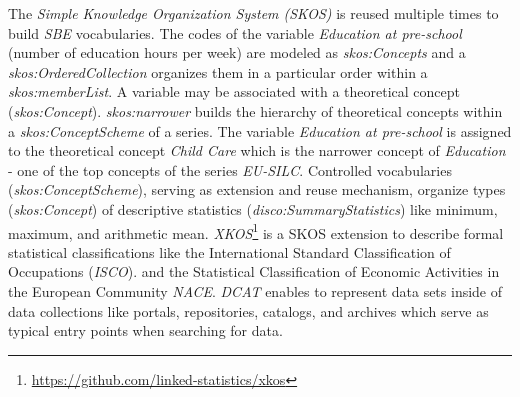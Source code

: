\documentclass{llncs}
\begin{document}
The \emph{Simple Knowledge Organization System (SKOS)} is reused multiple times to build \emph{SBE} vocabularies.
The codes of the variable \emph{Education at pre-school} (number of education hours per week) are modeled as \emph{skos:Concepts} and 
a \emph{skos:OrderedCollection} organizes them in a particular order within a \emph{skos:memberList}.
A variable may be associated with a theoretical concept (\emph{skos:Concept}). 
\emph{skos:narrower} builds the hierarchy of theoretical concepts within a \emph{skos:ConceptScheme} of a series.
The variable \emph{Education at pre-school} is assigned to the theoretical concept \emph{Child Care} which is the narrower concept of \emph{Education} - one of the top concepts of the series \emph{EU-SILC}.
Controlled vocabularies (\emph{skos:ConceptScheme}), serving as extension and reuse mechanism,
organize types (\emph{skos:Concept}) of descriptive statistics (\emph{disco:SummaryStatistics}) like minimum, maximum, and arithmetic mean.
\emph{XKOS}\footnote{\url{https://github.com/linked-statistics/xkos}} is a SKOS extension to describe formal statistical classifications like the International Standard Classification of Occupations (\emph{ISCO}). 
and the Statistical Classification of Economic Activities in the European Community \emph{NACE}.
\emph{DCAT} enables to represent data sets inside of data collections like portals, repositories, catalogs, and archives
which serve as typical entry points when searching for data.

\end{document}
